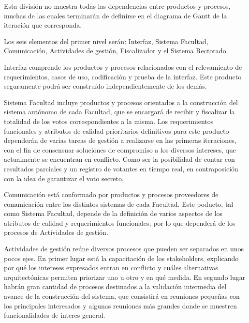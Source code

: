 Esta división no muestra todas las dependencias entre productos y procesos, muchas de las cuales terminarán de definirse en el diagrama de Gantt de la iteración que corresponda.
\\ \par

Los seis elementos del primer nivel serán: Interfaz, Sistema Facultad, Comunicación, Actividades de gestión, Fiscalizador y el Sistema Rectorado.
\\ \par
Interfaz comprende los productos y procesos relacionados con el relevamiento de requerimientos, casos de uso, codificación y prueba de la interfaz. Este producto seguramente podrá ser construído independientemente de los demás.
\\ \par
Sistema Facultad incluye productos y procesos orientados a la construcción del sistema autónomo de cada Facultad, que se encargará de recibir y fiscalizar la totalidad de los votos correspondientes a la misma. Los requerimientos funcionales y atributos de calidad prioritarios definitivos para este producto dependerán de varias tareas de gestión a realizarse en las primeras iteraciones, con el fin de consensuar soluciones de compromiso a los diversos intereses, que actualmente se encuentran en conflicto. Como ser la posibilidad de contar con resultados parciales y un registro de votantes en tiempo real, en contraposición con la idea de garantizar el voto secreto.
\\ \par
Comunicación está conformado por productos y procesos proveedores de comunicación entre los distintos sistemas de cada Facultad. Este poducto, tal como Sistema Facultad, depende de la definición de varios aspectos de los atributos de calidad y requerimientos funcionales, por lo que dependerá de los procesos de Actividades de gestión.
\\ \par
Actividades de gestión reúne diversos procesos que pueden ser separados en unos pocos ejes. En primer lugar está la capacitación de los stakeholders, explicando por qué los intereses expresados entran en conflicto y cuáles alternativas arquitectónicas permiten priorizar uno u otro y en qué medida.
En segundo lugar habrán gran cantidad de procesos destinados a la validación intermedia del avance de la construcción del sistema, que consistirá en reuniones pequeñas con los principales interesados y algunas reuniones más grandes donde se muestren funcionalidades de interes general.
